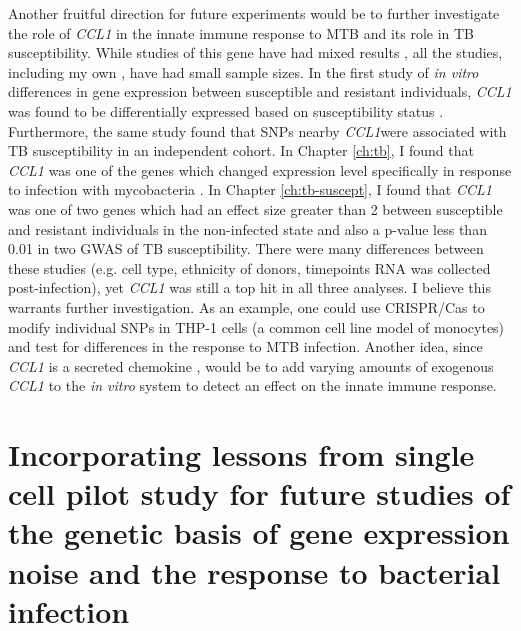 Another fruitful direction for future experiments would be to further
investigate the role of \emph{CCL1} in the innate immune response to
MTB and its role in TB susceptibility. While studies of this gene have
had mixed results \citep{Thuong2008, Tang2011, Ozdemir2013},
all the studies, including my own \citep{Blischak2015}, have had small
sample sizes. In the first study of \emph{in vitro} differences in
gene expression between susceptible and resistant individuals,
\emph{CCL1} was found to be differentially expressed based on
susceptibility status \citep{Thuong2008}. Furthermore, the same study
found that SNPs nearby \emph{CCL1}were associated with TB
susceptibility in an independent cohort. In Chapter \ref{ch:tb}, I
found that \emph{CCL1} was one of the genes which changed expression
level specifically in response to infection with mycobacteria \citep{Blischak2015}. In
Chapter \ref{ch:tb-suscept}, I found that \emph{CCL1} was one of two
genes which had an effect size greater than 2 between susceptible and
resistant individuals in the non-infected state and also a p-value less
than 0.01 in two GWAS of TB susceptibility. There were many
differences between these studies (e.g. cell type, ethnicity of
donors, timepoints RNA was collected post-infection), yet \emph{CCL1}
was still a top hit in all three analyses. I believe this warrants
further investigation. As an example, one could use CRISPR/Cas \citep{Du2016} to
modify individual SNPs in THP-1 cells (a common cell line model of
monocytes) and test for differences in the response to MTB
infection. Another idea, since \emph{CCL1} is a secreted chemokine \citep{Miller1992},
would be to add varying amounts of exogenous \emph{CCL1} to the
\emph{in vitro} system to detect an effect on the innate immune
response.

\section{Incorporating lessons from single cell pilot study for future studies of the genetic basis of gene expression noise and the response to bacterial infection}

